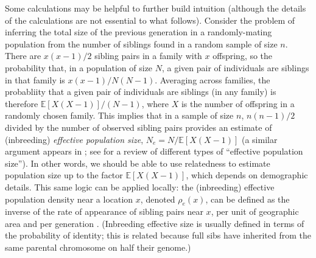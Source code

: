 \documentclass{ar-1col}
\renewcommand{\emph}[1]{{\textit{#1}}}
\newcommand{\E}{\mathbb{E}}
\newcommand{\details}[1]{}
\begin{document}
Some calculations may be helpful to further build intuition
(although the details of the calculations are not essential to what follows).
Consider the problem of inferring the total size of the previous generation
in a randomly-mating population
from the number of siblings found in a random sample of size $n$.
There are $x (x-1) / 2$ sibling pairs in a family with $x$ offspring,
so the probability that, 
in a population of size $N$, 
a given pair of individuals are siblings in that family is $x(x-1)/N(N-1)$.
Averaging across families, the probabliity that a given pair of individuals
are siblings (in any family)
is therefore $\E[X (X-1)] / (N-1)$, where $X$ is the number of offspring in a randomly chosen family.
This implies that in a sample of size $n$,
$n(n-1)/2$ divided by the number of observed sibling pairs 
provides an estimate of (inbreeding) \emph{effective population size}, 
$N_e = N/\E[X(X-1)]$ 
(a similar argument appears in \citet{mohle2003cpd}; 
see \citet{wang2016prediction} for a review of different types of ``effective population size'').
In other words, we should be able to use relatedness to estimate population size
up to the factor $\E[X(X-1)]$, which depends on demographic details. 
This same logic can be applied locally:
the (inbreeding) effective population density
near a location $x$, denoted $\rho_e(x)$,
can be defined as the inverse of the rate of appearance of sibling pairs
near $x$, per unit of geographic area and per generation \citep{barton-depaulis-etheridge}.
(Inbreeding effective size is usually defined in terms of the probability of identity;
this is related because full sibs have inherited from the same parental chromosome on half their genome.)

\details{
Let $P$ denote the probability that two diploids sampled from the population are siblings, and
let $Q$be the probability that randomly sampled chromosomes from two randomly sampled diploids inherit from the same parental chromosome at a randomly chosen locus.
Claim: Assuming monogamy (no half-sibs), $1/P$ is ``diploid inbreeding $N_e$'', 
defined (in \citet{ewens2004mpg}) to be $1/(2Q)$.  
(Note the caveates about diploidy do not appear in Ewens.)
Proof: Under monogamy, the chance a random locus on random chromosomes from the two diploids are IBD from a common parent is $1/2$, so $Q = P/2$.
}
\end{document}
